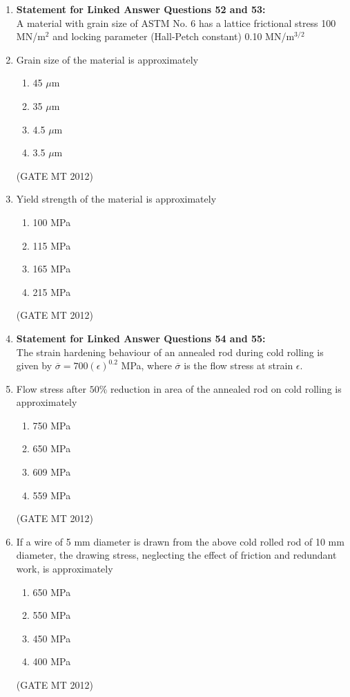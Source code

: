 \documentclass[journal, 11pt, onecolumn]{IEEEtran}
\theoremstyle{remark}
\begin{document}
\begin{enumerate}
\begin{enumerate}
\item[] \textbf{Statement for Linked Answer Questions 52 and 53:} \\
A material with grain size of ASTM No. 6 has a lattice frictional stress 100 MN/m$^2$ and locking parameter (Hall-Petch constant) 0.10 MN/m$^{3/2}$

\item Grain size of the material is approximately
\begin{multicols}{2}
\begin{enumerate}  
\item 45 $\mu$m
\item 35 $\mu$m
\item 4.5 $\mu$m
\item 3.5 $\mu$m
\end{enumerate}
\end{multicols}
\hfill(GATE MT 2012)

\item Yield strength of the material is approximately
\begin{multicols}{2}
\begin{enumerate}  
\item 100 MPa
\item 115 MPa
\item 165 MPa
\item 215 MPa
\end{enumerate}
\end{multicols}
\hfill(GATE MT 2012)

\item[] \textbf{Statement for Linked Answer Questions 54 and 55:}\\
The strain hardening behaviour of an annealed rod during cold rolling is given by $\overline{\sigma} = 700(\epsilon)^{0.2}$ MPa, where $\overline{\sigma}$ is the flow stress at strain $\epsilon$.

\item Flow stress after $50\%$ reduction in area of the annealed rod on cold rolling is approximately
\begin{multicols}{2}
\begin{enumerate}  
\item 750 MPa
\item 650 MPa
\item 609 MPa
\item 559 MPa
\end{enumerate}
\end{multicols}
\hfill(GATE MT 2012)

\item If a wire of 5 mm diameter is drawn from the above cold rolled rod of 10 mm diameter, the drawing stress, neglecting the effect of friction and redundant work, is approximately
\begin{multicols}{2}
\begin{enumerate}  
\item 650 MPa
\item 550 MPa
\item 450 MPa
\item 400 MPa
\end{enumerate}
\end{multicols}
\hfill(GATE MT 2012)


\end{enumerate}
\end{enumerate}
\end{document}

